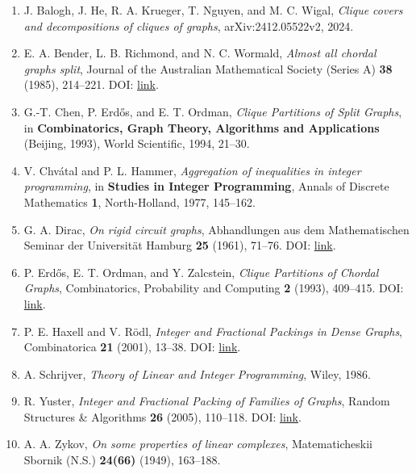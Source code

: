 \documentclass[11pt,a4paper]{article}
\begin{document}
\begin{enumerate}
\def\labelenumi{\arabic{enumi}.}
\item
  J. Balogh, J. He, R. A. Krueger, T. Nguyen, and M. C. Wigal,
  \emph{Clique covers and decompositions of cliques of graphs},
  arXiv:2412.05522v2, 2024.
\item
  E. A. Bender, L. B. Richmond, and N. C. Wormald,
  \emph{Almost all chordal graphs split},
  Journal of the Australian Mathematical Society (Series A) \textbf{38} (1985),
  214--221.
  DOI: \href{https://doi.org/10.1017/S1446788700023077}{link}.
\item
  G.-T. Chen, P. Erdős, and E. T. Ordman,
  \emph{Clique Partitions of Split Graphs},
  in \textbf{Combinatorics, Graph Theory, Algorithms and Applications}
  (Beijing, 1993), World Scientific, 1994, 21--30.
\item
  V. Chvátal and P. L. Hammer,
  \emph{Aggregation of inequalities in integer programming},
  in \textbf{Studies in Integer Programming}, Annals of Discrete Mathematics
  \textbf{1}, North-Holland, 1977, 145--162.
\item
  G. A. Dirac,
  \emph{On rigid circuit graphs},
  Abhandlungen aus dem Mathematischen Seminar der Universität Hamburg
  \textbf{25} (1961), 71--76.
  DOI: \href{https://doi.org/10.1007/BF02992776}{link}.
\item
  P. Erdős, E. T. Ordman, and Y. Zalcstein,
  \emph{Clique Partitions of Chordal Graphs},
  Combinatorics, Probability and Computing \textbf{2} (1993), 409--415.
  DOI: \href{https://doi.org/10.1017/S0963548300000808}{link}.
\item
  P. E. Haxell and V. Rödl,
  \emph{Integer and Fractional Packings in Dense Graphs},
  Combinatorica \textbf{21} (2001), 13--38.
  DOI: \href{https://doi.org/10.1007/s004930170003}{link}.
\item
  A. Schrijver,
  \emph{Theory of Linear and Integer Programming},
  Wiley, 1986.
\item
  R. Yuster,
  \emph{Integer and Fractional Packing of Families of Graphs},
  Random Structures \& Algorithms \textbf{26} (2005), 110--118.
  DOI: \href{https://doi.org/10.1002/rsa.20048}{link}.
\item
  A. A. Zykov,
  \emph{On some properties of linear complexes},
  Matematicheskii Sbornik (N.S.) \textbf{24(66)} (1949), 163--188.
\end{enumerate}
\end{document}
